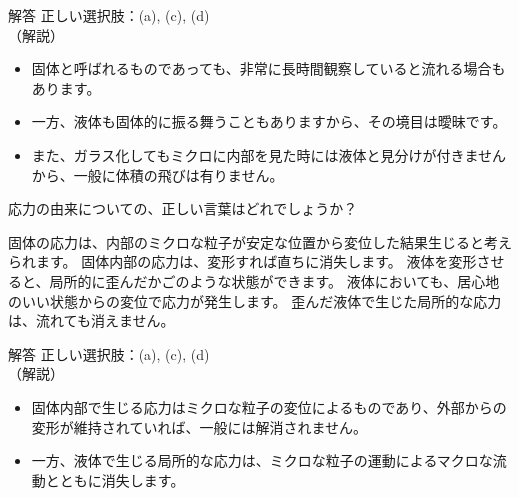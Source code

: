 \documentclass[uplatex,dvipdfmx,a4paper,11pt]{jsarticle}
\begin{document}
\begin{qlist}
        \vspace{3mm}
        \begin{itembox}[l]{解答}
            正しい選択肢：(a), (c), (d)\\
            （解説）
			\begin{itemize}
				\item 固体と呼ばれるものであっても、非常に長時間観察していると流れる場合もあります。
				\item  一方、液体も固体的に振る舞うこともありますから、その境目は曖昧です。
				\item また、ガラス化してもミクロに内部を見た時には液体と見分けが付きませんから、一般に体積の飛びは有りません。
			\end{itemize}
        \end{itembox}
	\qitem 応力の由来についての、正しい言葉はどれでしょうか？
		\begin{qlist2}
			\qitem 固体の応力は、内部のミクロな粒子が安定な位置から変位した結果生じると考えられます。
			\qitem 固体内部の応力は、変形すれば直ちに消失します。
			\qitem 液体を変形させると、局所的に歪んだかごのような状態ができます。
			\qitem 液体においても、居心地のいい状態からの変位で応力が発生します。
			\qitem 歪んだ液体で生じた局所的な応力は、流れても消えません。
		\end{qlist2}
        \vspace{3mm}
        \begin{itembox}[l]{解答}
            正しい選択肢：(a), (c), (d)\\
            （解説）
			\begin{itemize}
				\item 固体内部で生じる応力はミクロな粒子の変位によるものであり、外部からの変形が維持されていれば、一般には解消されません。
				\item 一方、液体で生じる局所的な応力は、ミクロな粒子の運動によるマクロな流動とともに消失します。
			\end{itemize}
        \end{itembox}
\end{qlist}

\clearpage
\end{document}
